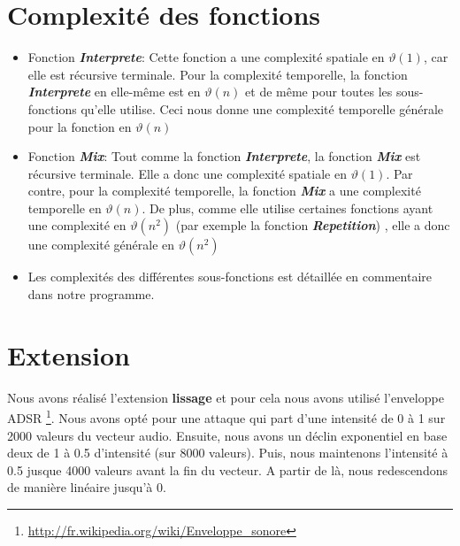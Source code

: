 \documentclass[a4paper,12pt]{report}
\begin{document}
\section*{Complexité des fonctions}
\begin{itemize}


\item Fonction \textit{\textbf{Interprete}}: Cette fonction a une complexité spatiale en $\vartheta(1)$, car elle est récursive terminale.
Pour la complexité temporelle, la fonction \textit{\textbf {Interprete}} en elle-même est en  $\vartheta(n)$ et de même pour toutes les sous-fonctions qu'elle utilise. Ceci nous donne une complexité temporelle  générale pour la fonction en  $\vartheta(n)$
\item Fonction \textit{\textbf{Mix}}: Tout comme la fonction \textit{\textbf{Interprete}}, la fonction \textit{\textbf{Mix}} est récursive terminale. Elle a donc une complexité spatiale en  $\vartheta(1)$. Par contre, pour la complexité temporelle, la fonction \textit{\textbf{Mix}} a une complexité temporelle en  $\vartheta(n)$. De plus, comme elle utilise certaines fonctions ayant une complexité en  $\vartheta(n^2)$ (par exemple la fonction \textit{\textbf{Repetition}}) , elle a donc une complexité générale en  $\vartheta(n^2)$
\item Les complexités des différentes sous-fonctions est détaillée en commentaire dans notre programme. 

\end{itemize} 


\section*{Extension}
Nous avons réalisé l'extension {\large \textbf{lissage}} et pour cela nous avons utilisé l'enveloppe ADSR \footnote{\url{http://fr.wikipedia.org/wiki/Enveloppe_sonore}}. Nous avons opté pour une attaque qui part d'une intensité de 0 à 1 sur 2000 valeurs du vecteur audio. Ensuite, nous avons un déclin exponentiel en base deux de 1 à 0.5 d'intensité (sur 8000 valeurs). Puis, nous maintenons l'intensité à 0.5 jusque 4000 valeurs avant la fin du vecteur. A partir de là, nous redescendons de manière linéaire jusqu'à 0.
\end{document}
